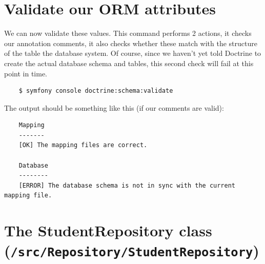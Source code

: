 \documentclass[a4paperpaper,openright]{book}
\newenvironment{Shaded}{}{}
\newcommand{\CommentTok}[1]{\textcolor[rgb]{0.38,0.63,0.69}{\textit{#1}}}
\newcommand{\KeywordTok}[1]{\textcolor[rgb]{0.00,0.44,0.13}{\textbf{#1}}}
\newcommand{\OtherTok}[1]{\textcolor[rgb]{0.00,0.44,0.13}{#1}}
\begin{document}
\begin{Shaded}
\end{Shaded}

\hypertarget{validate-our-orm-attributes}{%
\section{Validate our ORM
attributes}\label{validate-our-orm-attributes}}

We can now validate these values. This command performs 2 actions, it
checks our annotation comments, it also checks whether these match with
the structure of the table the database system. Of course, since we
haven't yet told Doctrine to create the actual database schema and
tables, this second check will fail at this point in time.

\begin{verbatim}
    $ symfony console doctrine:schema:validate
\end{verbatim}

The output should be something like this (if our comments are valid):

\begin{verbatim}
    Mapping
    -------
    [OK] The mapping files are correct.

    Database
    --------
    [ERROR] The database schema is not in sync with the current mapping file.
\end{verbatim}

\hypertarget{the-studentrepository-class-srcrepositorystudentrepository}{%
\section{\texorpdfstring{The StudentRepository class
(\texttt{/src/Repository/StudentRepository})}{The StudentRepository class (/src/Repository/StudentRepository)}}\label{the-studentrepository-class-srcrepositorystudentrepository}}
\end{document}
